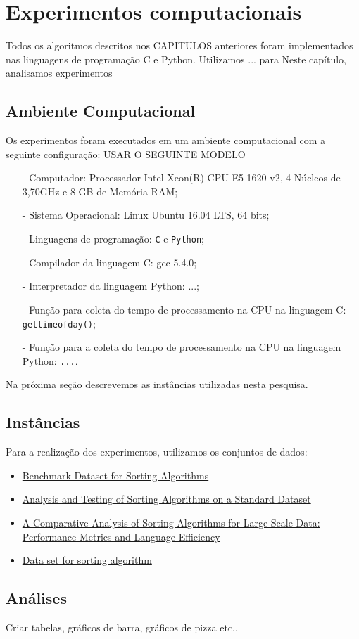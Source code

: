 \chapter{Experimentos computacionais}

Todos os algoritmos descritos nos CAPITULOS anteriores foram implementados nas linguagens de programação C e Python. Utilizamos ... para 
Neste capítulo, analisamos experimentos 
\section{Ambiente Computacional}
\label{sec:Env}
Os experimentos foram executados em um ambiente computacional com a seguinte configuração: USAR O SEGUINTE MODELO 
\begin{itemize}
    \item[-] Computador: Processador Intel Xeon(R) CPU E5-1620 v2, 4 Núcleos de 3,70GHz e 8 GB de Memória RAM;
    \item[-] Sistema Operacional: Linux Ubuntu 16.04 LTS, 64 bits;
    \item[-] Linguagens de programação: \texttt{C} e \texttt{Python};
    \item[-] Compilador da linguagem C: gcc 5.4.0;
    \item[-] Interpretador da linguagem Python: ...;
    \item[-] Função para coleta do tempo de processamento na CPU na linguagem C: \texttt{gettimeofday()};
    \item[-] Função para a coleta do tempo de processamento na CPU na linguagem Python: \texttt{...}.
\end{itemize}


Na próxima seção descrevemos as instâncias utilizadas nesta pesquisa.

\section{Instâncias}
\label{sec:Inst}
Para a realização dos experimentos, utilizamos os conjuntos de dados:
\begin{itemize}
\item 
\href{https://www.kaggle.com/datasets/bekiremirhanakay/benchmark-dataset-for-sorting-algorithms}{Benchmark Dataset for Sorting Algorithms}

\item 
\href{https://ieeexplore.ieee.org/document/7280062}{Analysis and Testing of Sorting Algorithms on a Standard Dataset}

\item 
\href{https://link.springer.com/chapter/10.1007/978-981-97-5703-9_8}{A Comparative Analysis of Sorting Algorithms for Large-Scale Data: Performance Metrics and Language Efficiency}

\item 
\href{https://www.kaggle.com/datasets/wazahathussain/data-set-for-sorting-algorithm}{Data set for sorting algorithm}

\end{itemize}

\section{Análises}
Criar tabelas, gráficos de barra, gráficos de pizza etc.. 
